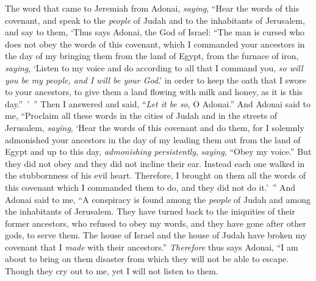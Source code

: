\begin{biblechapter} %
 The word that came to Jeremiah from Adonai, \textit{saying},
\verse “Hear the words of this covenant, and speak to the \textit{people} of Judah and to the inhabitants of Jerusalem,
\verse and say to them, ‘Thus says Adonai, the God of Israel: “The man is cursed who does not obey the words of this covenant,
\verse which I commanded your ancestors in the day of my bringing them from the land of Egypt, from the furnace of iron, \textit{saying}, ‘Listen to my voice and do according to all that I command you, \textit{so will you be my people, and I will be your God}.’
\verse in order to keep the oath that I swore to your ancestors, to give them a land flowing with milk and honey, as it is this day.” ’ ” Then I answered and said, “\textit{Let it be so}, O Adonai.”
\verse And Adonai said to me, “Proclaim all these words in the cities of Judah and in the streets of Jerusalem, \textit{saying}, ‘Hear the words of this covenant and do them,
\verse for I solemnly admonished your ancestors in the day of my leading them out from the land of Egypt and up to this day, \textit{admonishing persistently}, \textit{saying}, “Obey my voice.”
\verse But they did not obey and they did not incline their ear. Instead each one walked in the stubbornness of his evil heart. Therefore, I brought on them all the words of this covenant which I commanded them to do, and they did not do it.’ ”
\verse And Adonai said to me, “A conspiracy is found among the \textit{people} of Judah and among the inhabitants of Jerusalem.
\verse They have turned back to the iniquities of their former ancestors, who refused to obey my words, and they have gone after other gods, to serve them. The house of Israel and the house of Judah have broken my covenant that I \textit{made} with their ancestors.”
\verse \textit{Therefore} thus says Adonai, “I am about to bring on them disaster from which they will not be able to escape. Though they cry out to me, yet I will not listen to them.

\end{biblechapter}
